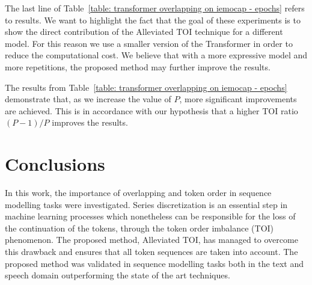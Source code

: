 \documentclass[11pt,a4paper]{article}
\begin{document}
\begin{table}[t]
\centering
{}
\caption{
    \label{table: transformer overlapping on iemocap - epochs}
    Token order imbalance (TOI) comparison for the IEMOCAP dataset on a SER task using \textit{angry, happy, neutral and sad} classes for 60 epochs using the Transformer model.
  }
\end{table}

The last line of Table~\ref{table: transformer overlapping on iemocap - epochs} refers to \citet{Mirsamadi2017AutomaticSE} results. We want to highlight the fact that the goal of these experiments is to show the direct contribution of the Alleviated TOI technique for a different model. For this reason we use a smaller version of the Transformer in order to reduce the computational cost. We believe that with a more expressive model and more repetitions, the proposed method may further improve the results.

The results from Table~\ref{table: transformer overlapping on iemocap - epochs} demonstrate that, as we increase the value of $P$, more significant improvements are achieved. This is in accordance with our hypothesis that a higher TOI ratio $(P-1)/P$ improves the results.


\section{Conclusions}
In this work, the importance of overlapping and token order in sequence modelling tasks were investigated.
Series discretization is an essential step in machine learning processes which nonetheless can be responsible for the loss of the continuation of the tokens, through the token order imbalance (TOI) phenomenon.
The proposed method, Alleviated TOI, has managed to overcome this drawback and ensures that all token sequences are taken into account.
The proposed method was validated in sequence modelling tasks both in the text and speech domain outperforming the state of the art techniques.




\end{document}
